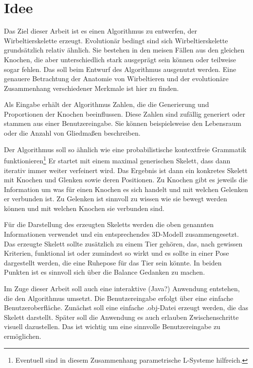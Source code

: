 
\chapter{Idee}

Das Ziel dieser Arbeit ist es einen Algorithmus zu entwerfen, der Wirbeltierskelette erzeugt. Evolutionär bedingt sind sich Wirbeltierskelette grundsätzlich relativ ähnlich. Sie bestehen in den meisen Fällen aus den gleichen Knochen, die aber unterschiedlich stark ausgeprägt sein können oder teilweise sogar fehlen. Das soll beim Entwurf des Algorithmus ausgenutzt werden. Eine genauere Betrachtung der Anatomie von Wirbeltieren und der evolutionäre Zusammenhang verschiedener Merkmale ist \zb hier \cite{Vergleichende_Anatomie} zu finden. 

Als Eingabe erhält der Algorithmus Zahlen, die die Generierung und Proportionen der Knochen beeinflussen. Diese Zahlen sind zufällig generiert oder stammen aus einer Benutzereingabe. Sie können beispielsweise den Lebensraum oder die Anzahl von Gliedmaßen beschreiben.

Der Algorithmus soll so ähnlich wie eine probabilistische kontextfreie Grammatik funktionieren\footnote{Eventuell sind in diesem Zusammenhang parametrische L-Systeme \cite{Paramteric_L-Systems} hilfreich.} Er startet mit einem maximal generischen Skelett, dass dann iterativ immer weiter verfeinert wird. Das Ergebnis ist dann ein konkretes Skelett mit Knochen und Glenken sowie deren Positionen. Zu Knochen gibt es jeweils die Information um was für einen Knochen es sich handelt und mit welchen Gelenken er verbunden ist. Zu Gelenken ist sinnvoll zu wissen wie sie bewegt werden können und mit welchen Knochen sie verbunden sind.

Für die Darstellung des erzeugten Skeletts werden die oben genannten Informationen verwendet und ein entsprechendes 3D-Modell zusammengesetzt.
Das erzeugte Skelett sollte zusätzlich zu einem Tier gehören, das, nach gewissen Kriterien, funktional ist oder zumindest so wirkt und es sollte in einer Pose dargestellt werden, die eine Ruhepose für das Tier sein könnte. In beiden Punkten ist es sinnvoll sich über die Balance Gedanken zu machen.  %

Im Zuge dieser Arbeit soll auch eine interaktive (Java?) Anwendung entstehen, die den Algorithmus umsetzt. Die Benutzereingabe erfolgt über eine einfache Benutzeroberfläche. Zunächst soll eine einfache .obj-Datei erzeugt werden, die das Skelett darstellt. Später soll die Anwendung es auch erlauben Zwischenschritte visuell dazustellen. Das ist wichtig um eine sinnvolle Benutzereingabe zu ermöglichen.

